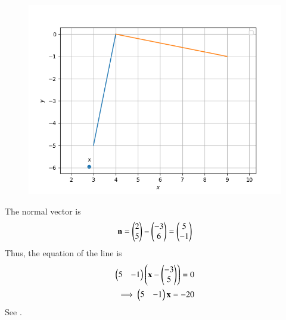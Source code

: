 	\begin{figure}[!ht]
		\centering
 \includegraphics[width=\columnwidth]{chapters/11/10/2/10/figs/Figure_1.png}
		\caption{}
		\label{fig:11/10/2/10}
  	\end{figure}
The normal vector is
\begin{align}
\mathbf{n} =\begin{pmatrix}2 \\5\end{pmatrix} -  \begin{pmatrix}-3 \\ 6\end{pmatrix} 
=\begin{pmatrix}
    5\\
    -1
\end{pmatrix}
\end{align}
Thus, the equation of the line is 
\begin{align}
\begin{pmatrix}
    5 &-1
	\end{pmatrix}\left(\mathbf{x} - \begin{pmatrix}-3 \\5\end{pmatrix}\right)
= 0
\\
\implies 
\begin{pmatrix}
    5 &-1
	\end{pmatrix}\mathbf{x} 
= -20
\end{align}
See 
		.
